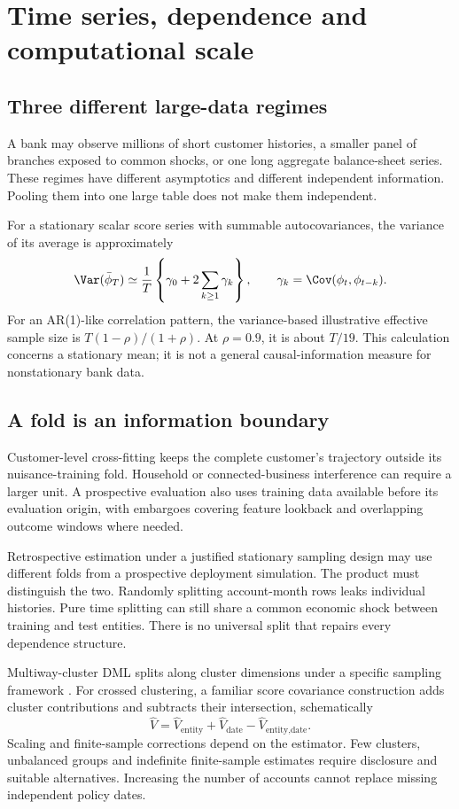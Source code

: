 \chapter{Time series, dependence and computational scale}\label{ch:scale}
\section{Three different large-data regimes}
A bank may observe millions of short customer histories, a smaller panel of
branches exposed to common shocks, or one long aggregate balance-sheet
series. These regimes have different asymptotics and different independent
information. Pooling them into one large table does not make them independent.

For a stationary scalar score series with summable autocovariances, the
variance of its average is approximately
\begin{equation}
 \Var(\bar\phi_T)\simeq
 \frac{1}{T}\left\{\gamma_0+2\sum_{k\geq1}\gamma_k\right\},
 \qquad \gamma_k=\Cov(\phi_t,\phi_{t-k}).
 \label{eq:lrv}
\end{equation}
For an AR(1)-like correlation pattern, the variance-based illustrative
effective sample size is $T(1-\rho)/(1+\rho)$.
At $\rho=0.9$, it is about $T/19$. This calculation concerns a stationary
mean; it is not a general causal-information measure for nonstationary
bank data.

\section{A fold is an information boundary}
Customer-level cross-fitting keeps the complete customer's trajectory
outside its nuisance-training fold. Household or connected-business
interference can require a larger unit. A prospective evaluation also uses
training data available before its evaluation origin, with embargoes covering
feature lookback and overlapping outcome windows where needed.

Retrospective estimation under a justified stationary sampling design may
use different folds from a prospective deployment simulation. The product
must distinguish the two. Randomly splitting account-month rows leaks
individual histories. Pure time splitting can still share a common economic
shock between training and test entities. There is no universal split that
repairs every dependence structure.

Multiway-cluster DML splits along cluster dimensions under a specific
sampling framework \citep{cluster2021}. For crossed clustering, a familiar
score covariance construction adds cluster contributions and subtracts their
intersection, schematically
\[
 \widehat V=\widehat V_{\text{entity}}
            +\widehat V_{\text{date}}
            -\widehat V_{\text{entity,date}}.
\]
Scaling and finite-sample corrections depend on the estimator. Few clusters,
unbalanced groups and indefinite finite-sample estimates require disclosure
and suitable alternatives. Increasing the number of accounts cannot replace
missing independent policy dates.

